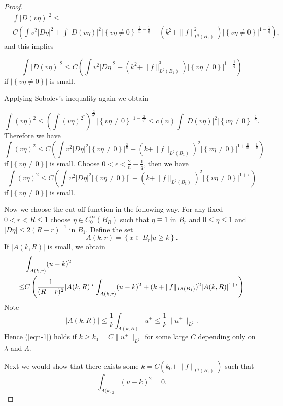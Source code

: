 \begin{proof}
\begin{align*}
  &\int |D(v\eta)|^2\le\\
		      &C\left( \int v^2|D\eta|^2+\int|D(v\eta)|^2|\left\{v\eta\neq 0\right\} |^{\frac{2}{n}-\frac{1}{q}}+(k^2+\|f\|_{L^q(B_1)}^2)|\left\{v\eta\neq 0\right\} |^{1-\frac{1}{q}}  \right), 
\end{align*}
and this implies

\begin{equation}
  \int|D(v\eta)|^2\le C\left(\int v^2|D\eta|^2+(k^2+\|f\|_{L^{q}(B_1)}^{^2})|\left\{v\eta\neq 0\right\} |^{1-\frac{1}{q}} \right) 
\end{equation} 
if $ |\left\{v\eta\neq 0\right\} |$ is small.

Applying Sobolev's inequality again we obtain

\[
  \int(v\eta)^2\le\left( \int(v\eta)^{2^*} \right) ^{\frac{2}{2^*}}|\left\{v\eta\neq 0\right\} |^{1-\frac{2}{2^*}}\le c(n)\int|D(v\eta)|^2|\left\{v\eta\neq 0\right\} |^{\frac{2}{n}}.
\] 
Therefore we have 
\[
  \int(v\eta)^2\le C\left( \int v^2|D\eta|^2|\left\{v\eta\neq 0\right\} |^{\frac{2}{n}}+(k+\|f\|_{L^{q}(B_1)})^2|\left\{v\eta\neq 0\right\} |^{1+\frac{2}{n}-\frac{1}{q}} \right) 
\] 
if $|\left\{v\eta\neq 0\right\} |$ is small. Choose $0<\epsilon<\frac{2}{n}-\frac{1}{q} $, then we have
\[
  \int (v\eta)^2\le C\left( \int v^2|D\eta|^2|\left\{v\eta\neq 0\right\} |^{\epsilon }+(k+\|f\|_{L^{q}(B_1)})^2|\left\{v\eta\neq 0\right\} |^{1+\epsilon } \right) 
\] 
if $|\left\{v\eta\neq 0\right\} |$ is small. 

Now we choose the cut-off function in the following way. For any fixed $0<r<R\le 1$ choose $\eta \in C_0^{\infty}(B_R)$ such that $\eta\equiv 1$ in $B_r$ and $0\le \eta\le 1$ and $|D\eta|\le 2(R-r)^{-1}$ in $B_1$. Define the set
\[
  A(k,r)=\left\{x\in B_r\lvert u\ge k\right\} .
\] 
If $|A(k,R)|$ is small, we obtain
\begin{align}
  & \int_{A(k,r)}(u-k)^2\notag\\
  \le & C\left( \frac{1}{(R-r)^2}|A(k,R)|^{\epsilon }\int_{A(k,r)}(u-k)^2+(k+\|f\|_{L^{q}(B_1)})^2|A(k,R)|^{1+\epsilon } \right) \label{eqn-1}
\end{align}
Note 
\[
  |A(k,R)|\le \frac{1}{k}\int_{A(k,R)}u^{+}\le \frac{1}{k}\|u^{+}\|_{L^2}.
\] 
Hence (\ref{eqn-1}) holds if $k\ge k_0=C\|u^{+}\|_{L^2}$ for some large $C$ depending only on $\lambda$ and $\Lambda$.


Next we would show that there exists some $k=C\left( k_0+\|f\|_{L^{q}(B_1)} \right) $ such that 
\[
  \int_{A(k,\frac{1}{2}}(u-k)^2=0.
\] 


\end{proof}
